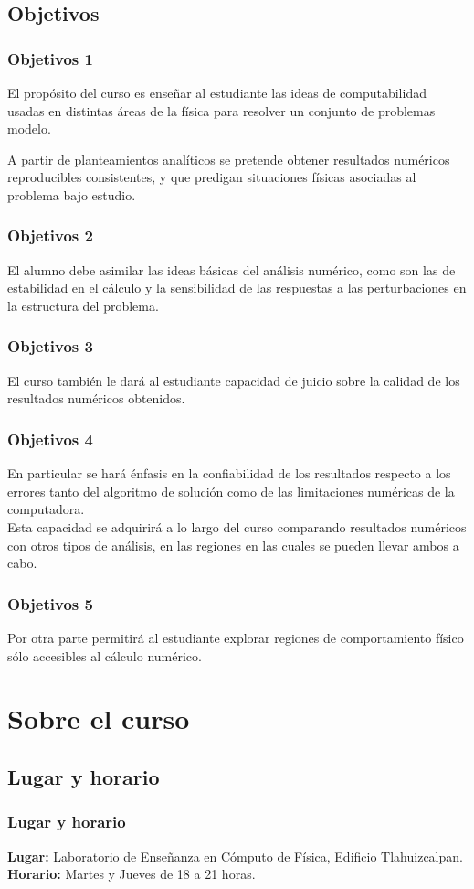 \subsection{Objetivos}
\begin{frame}
\frametitle{Objetivos 1}
El propósito del curso es enseñar al estudiante las ideas de computabilidad usadas en distintas áreas de la  física para resolver un conjunto de problemas modelo. 
\end{frame}
\begin{frame}
A partir de planteamientos analíticos se pretende obtener resultados numéricos reproducibles consistentes, y que predigan situaciones físicas asociadas al problema bajo estudio.
\end{frame}
\begin{frame}
\frametitle{Objetivos 2}
El alumno debe asimilar las ideas básicas del análisis numérico, como son las de estabilidad en el cálculo y la sensibilidad de las respuestas a las perturbaciones en la estructura del problema.
\end{frame}
\begin{frame}
\frametitle{Objetivos 3}
El curso también le dará al estudiante capacidad de juicio sobre la calidad de los resultados numéricos obtenidos.
\end{frame}
\begin{frame}
\frametitle{Objetivos 4}
En particular se hará énfasis en la confiabilidad de los resultados respecto a los errores tanto del algoritmo de solución como de las limitaciones numéricas de la computadora. 
\\
\bigskip
Esta capacidad se adquirirá a lo largo del curso comparando resultados numéricos con otros tipos de análisis, en las regiones en las cuales se pueden llevar ambos a cabo.
\end{frame}
\begin{frame}
\frametitle{Objetivos 5}
 Por otra parte permitirá al estudiante explorar regiones de comportamiento físico sólo accesibles al cálculo numérico.
\end{frame}
\section{Sobre el curso}
\subsection{Lugar y horario}
\begin{frame}
\frametitle{Lugar y horario} 
\textbf{Lugar: }Laboratorio de Enseñanza en Cómputo de Física, Edificio Tlahuizcalpan.
\\
\bigskip
\textbf{Horario: } Martes y Jueves de 18 a 21 horas.
\end{frame}
